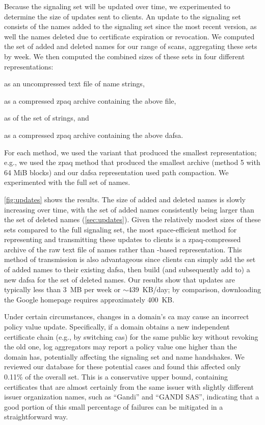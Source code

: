 Because the signaling set will be updated over time, we 
experimented to determine the size of updates sent to clients. An
update to the signaling set consists of the names added to the signaling set
since the most recent version, as well the names deleted due to certificate
expiration or revocation. We computed the set of added and deleted names for our
range of scans, aggregating these sets by week. We then computed the combined
sizes of these sets in four different representations:
\begin{inparaenum}[(1)]
\item as an uncompressed text file of name strings,
\item as a compressed zpaq archive containing the above file,
\item as  of the set of strings, and
\item as a compressed zpaq archive containing the above \ac{dafsa}.
\end{inparaenum}
For each method, we used the variant that produced the smallest representation;
e.g., we used the zpaq method that produced the smallest archive (method
5 with 64 MiB blocks) and our \ac{dafsa} representation used path compaction.
We experimented with the full set of names.

\autoref{fig:updates} shows the results. The size of added and deleted names is
slowly increasing over time, with the set of added names consistently being
larger than the set of deleted names (\autoref{sec:updates}). Given
the relatively modest sizes of these sets compared to the full signaling set,
the most space-efficient method for representing and transmitting these updates
to clients is a zpaq-compressed archive of the raw text file of names rather
than -based representation. This method of transmission is also
advantageous since clients can simply add the set of added names to their
existing \ac{dafsa}, then build (and subsequently add to) a new \ac{dafsa} for
the set of deleted names. Our results show that updates are typically less than
3~MB per week or $\sim$439~KB/day; by comparison, downloading the Google
homepage requires approximately 400~KB.

Under certain circumstances, changes in a domain's \ac{ca} may cause an
incorrect policy value update. Specifically, if a domain obtains a new
independent certificate chain (e.g., by switching \acp{ca}) for the same public
key without revoking the old one, log aggregators may report a policy value one
higher than the domain has, potentially affecting the signaling set and
\ac{name} handshakes. We reviewed our database for these potential cases and
found this affected only 0.11\% of the overall set. This
is a conservative upper bound, containing certificates that are almost certainly
from the same issuer with slightly different issuer organization names, such as
``Gandi'' and ``GANDI SAS'', indicating that a good portion of this small percentage
of failures can be mitigated in a straightforward way.

